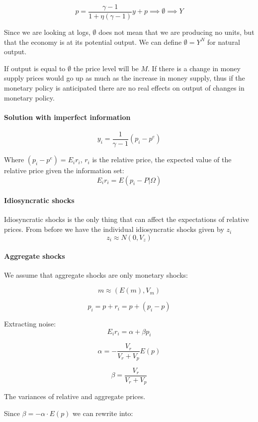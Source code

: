 \begin{equation*}
    p = \frac{\gamma - 1}{1 + \eta (\gamma -1)}y + p \implies \emptyset \implies Y
\end{equation*}

Since we are looking at logs, $\emptyset$ does not mean that we are producing no units, but that the economy is at its potential output. We can define $\emptyset = Y^N$ for natural output.

If output is equal to $\emptyset$ the price level will be $M$. If there is a change in money supply prices would go up as much as the increase in money supply, thus if the monetary policy is anticipated there are no real effects on output of changes in monetary policy. 

\paragraph{Solution with imperfect information}

$$
y_i = \frac{1}{\gamma - 1} (p_i - p^e)
$$

Where $(p_i - p^e) = E_i r_i$, $r_i$ is the relative price, the expected value of the relative price given the information set:
$$
E_i r_i = E \left( p_i - P \bigg\rvert \Omega  \right)
$$

\paragraph{Idiosyncratic shocks}
Idiosyncratic shocks is the only thing that can affect the expectations of relative prices. From before we have the individual idiosyncratic shocks given by $z_i$
$$
z_i \approx N(0, V_z)
$$


\paragraph{Aggregate shocks}
We assume that aggregate shocks are only monetary shocks:

$$
m \approx (E(m), V_m)
$$

$$
p_i = p + r_i = p + (p_i - p)
$$


Extracting noise:
$$
E_i r_i = \alpha + \beta p_i
$$


$$
\alpha = - \frac{V_{r}}{V_{r} + V_p} E(p)
$$


$$
\beta = \frac{V_{r}}{V_{r} + V_p}
$$

The variances of relative and aggregate prices. 


Since $\beta = -\alpha \cdot E(p)$ we can rewrite into:

